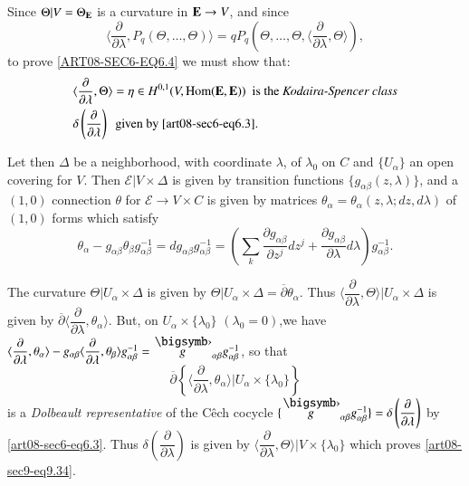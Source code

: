 Since $\Theta |V=\Theta_{\mathbf{E}}$ is a curvature in $\mathbf{E}\to V$, and since
$$
\langle \dfrac{\partial}{\partial\lambda}, P_{q}(\Theta,\ldots,\Theta)\rangle =qP_{q}(\Theta,\ldots,\Theta,\langle \dfrac{\partial}{\partial \lambda},\Theta\rangle ),
$$
to prove \eqref{ART08-SEC6-EQ6.4} we must show that:
\begin{align}
& \langle\dfrac{\partial}{\partial\lambda},\Theta\rangle=\eta\in H^{0,1}(V,\operatorname{\mathrm{Hom}}(\mathbf{E},\mathbf{E}))\text{~ is the {\em Kodaira-Spencer class}}\notag\\
& \delta\left(\dfrac{\partial}{\partial\lambda}\right)\text{~ given by \eqref{art08-sec6-eq6.3}}.\label{art08-sec9-eq9.34}
\end{align}

Let then $\Delta$ be a neighborhood, with coordinate $\lambda$, of $\lambda_{0}$ on $C$ and $\{U_{\alpha}\}$ an open covering for $V$. Then $\mathcal{E}|V\times \Delta$ is given by transition functions $\{g_{\alpha\beta}(z,\lambda)\}$, and a $(1,0)$ connection $\theta$ for $\mathcal{E}\to V\times C$ is given by matrices $\theta_{\alpha}=\theta_{\alpha}(z,\lambda;dz,d\lambda)$ of $(1,0)$ forms which satisfy
\begin{equation}
\theta_{\alpha}-g_{\alpha\beta}\theta_{\beta}g^{-1}_{\alpha\beta}=dg_{\alpha\beta}g^{-1}_{\alpha\beta}=\left(\sum\limits_{k}\dfrac{\partial g_{\alpha\beta}}{\partial z^{j}}dz^{j}+\dfrac{\partial g_{\alpha\beta}}{\partial \lambda}d\lambda\right)g^{-1}_{\alpha\beta}.\label{art08-sec9-eq9.35}
\end{equation}

The curvature $\Theta|U_{\alpha}\times \Delta$ is given by $\Theta |U_{\alpha}\times \Delta=\overline{\partial}\theta_{\alpha}$. Thus $\langle \dfrac{\partial}{\partial\lambda},\Theta\rangle |U_{\alpha}\times \Delta$ is given by $\overline{\partial}\langle \dfrac{\partial}{\partial\lambda},\theta_{\alpha}\rangle$. But, on $U_{\alpha}\times \{\lambda_{0}\}$ $(\lambda_{0}=0)$,\pageoriginale we have $\langle \dfrac{\partial}{\partial\lambda},\theta_{\alpha}\rangle - g_{\alpha\beta}\langle \dfrac{\partial}{\partial\lambda},\theta_{\beta}\rangle g^{-1}_{\alpha\beta}=\overdot{g}_{\alpha\beta}g^{-1}_{\alpha\beta}$, so that 
$$
\overline{\partial}\left\{\langle \dfrac{\partial}{\partial\lambda}, \theta_{\alpha}\rangle | U_{\alpha}\times \{\lambda_{0}\}\right\}
$$ 
is a {\em Dolbeault representative} of the C\^ech cocycle $\{\overdot{g}_{\alpha\beta}g^{-1}_{\alpha\beta}\}=\delta\left(\dfrac{\partial}{\partial\lambda}\right)$ by \eqref{art08-sec6-eq6.3}. Thus $\delta\left(\dfrac{\partial}{\partial\lambda}\right)$ is given by $\langle \dfrac{\partial}{\partial\lambda},\Theta\rangle | V\times \{\lambda_{0}\}$ which proves \eqref{art08-sec9-eq9.34}.

